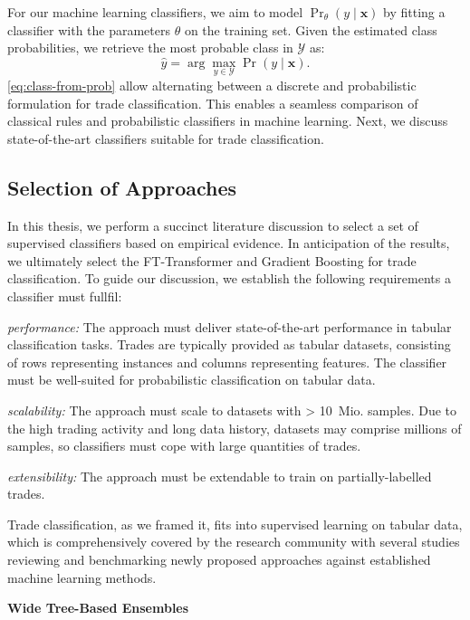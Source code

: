 For our machine learning classifiers, we aim to model $\Pr_{\theta}(y \mid \mathbf{x})$ by fitting a classifier with the parameters $\theta$ on the training set. Given the estimated class probabilities, we retrieve the most probable class in $\mathcal{Y}$ as:
\begin{equation}
    \hat{y}=\arg\max_{y \in \mathcal{Y}} \operatorname{Pr}(y \mid \mathbf{x}).
    \label{eq:class-from-prob}
\end{equation}
\cref{eq:class-from-prob} allow alternating between a discrete and probabilistic formulation for trade classification. This enables a seamless comparison of classical rules and probabilistic classifiers in machine learning.
Next, we discuss state-of-the-art classifiers suitable for trade classification.

\subsection{Selection of Approaches}\label{sec:selection-of-approaches}

In this thesis, we perform a succinct literature discussion to select a set of supervised classifiers based on empirical evidence. In anticipation of the results, we ultimately select the FT-Transformer and Gradient Boosting for trade classification. To guide our discussion, we establish the following requirements a classifier must fullfil:

\emph{performance:} The approach must deliver state-of-the-art performance in tabular classification tasks. Trades are typically provided as tabular datasets, consisting of rows representing instances and columns representing features. The classifier must be well-suited for probabilistic classification on tabular data.

\emph{scalability:}  The approach must scale to datasets with > 10~Mio. samples. Due to the high trading activity and long data history, datasets may comprise millions of samples, so classifiers must cope with large quantities of trades.

\emph{extensibility:} The approach must be extendable to train on partially-labelled trades.

Trade classification, as we framed it, fits into supervised learning on tabular data, which is comprehensively covered by the research community with several studies reviewing and benchmarking newly proposed approaches against established machine learning methods.

\textbf{Wide Tree-Based Ensembles}

